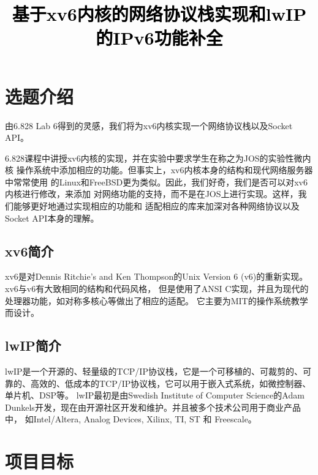 \documentclass[a4paper,twoside]{article}
\newcommand{\PaperTitle}{基于xv6内核的网络协议栈实现和lwIP的IPv6功能补全}  %
\begin{document}
\newpage

\title{
	\Large{\textcolor{black}{\PaperTitle}}
}
	
	
\maketitle
	
\tableofcontents
 
\newpage
\setcounter{page}{1}

\begin{spacing}{1.2}

\section{选题介绍}

由6.828 Lab 6\cite{kaashoek20066}得到的灵感，我们将为xv6内核实现一个网络协议栈以及Socket API。

6.828课程中讲授xv6内核\cite{cox2011xv6}的实现，并在实验中要求学生在称之为JOS的实验性微内核
操作系统中添加相应的功能。但事实上，xv6内核本身的结构和现代网络服务器中常常使用
的Linux和FreeBSD更为类似。因此，我们好奇，我们是否可以对xv6内核进行修改，来添加
对网络功能的支持，而不是在JOS上进行实现。这样，我们能够更好地通过实现相应的功能和
适配相应的库来加深对各种网络协议以及Socket API本身的理解。

\subsection{xv6简介}

xv6是对Dennis Ritchie's and Ken Thompson的Unix
Version 6 (v6)的重新实现。xv6与v6有大致相同的结构和代码风格，
但是使用了ANSI C实现，并且为现代的处理器功能，如对称多核心等做出了相应的适配。
它主要为MIT的操作系统教学而设计。

\subsection{lwIP简介}

lwIP\cite{dunkels2001design}是一个开源的、轻量级的TCP/IP协议栈，它是一个可移植的、可裁剪的、可靠的、高效的、低成本的TCP/IP协议栈，它可以用于嵌入式系统，如微控制器、单片机、DSP等。
lwIP最初是由Swedish Institute of Computer Science的Adam Dunkels开发，现在由开源社区开发和维护。并且被多个技术公司用于商业产品中，
如Intel/Altera, Analog Devices, Xilinx, TI, ST 和 Freescale。

\section{项目目标}


\end{spacing}
\end{document}
